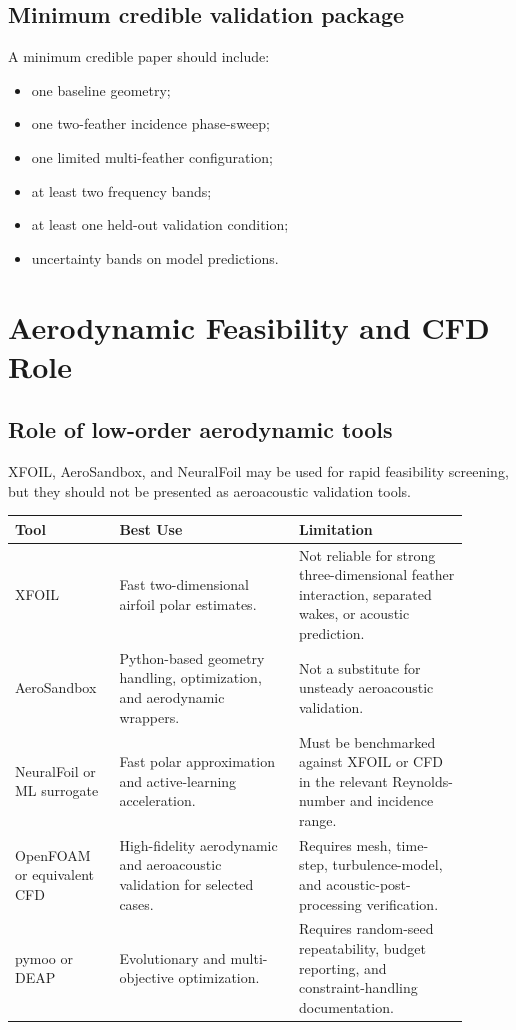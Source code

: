 \documentclass[11pt]{article}
\begin{document}
\subsection{Minimum credible validation package}

A minimum credible paper should include:

\begin{itemize}
    \item one baseline geometry;
    \item one two-feather incidence phase-sweep;
    \item one limited multi-feather configuration;
    \item at least two frequency bands;
    \item at least one held-out validation condition;
    \item uncertainty bands on model predictions.
\end{itemize}

\section{Aerodynamic Feasibility and CFD Role}

\subsection{Role of low-order aerodynamic tools}

XFOIL, AeroSandbox, and NeuralFoil may be used for rapid feasibility screening, but they should not be presented as aeroacoustic validation tools.

\begin{longtable}{p{0.2\linewidth} p{0.36\linewidth} p{0.34\linewidth}}
\toprule
\textbf{Tool} & \textbf{Best Use} & \textbf{Limitation} \\
\midrule
\endhead

XFOIL
&
Fast two-dimensional airfoil polar estimates.
&
Not reliable for strong three-dimensional feather interaction, separated wakes, or acoustic prediction.
\\

AeroSandbox
&
Python-based geometry handling, optimization, and aerodynamic wrappers.
&
Not a substitute for unsteady aeroacoustic validation.
\\

NeuralFoil or ML surrogate
&
Fast polar approximation and active-learning acceleration.
&
Must be benchmarked against XFOIL or CFD in the relevant Reynolds-number and incidence range.
\\

OpenFOAM or equivalent CFD
&
High-fidelity aerodynamic and aeroacoustic validation for selected cases.
&
Requires mesh, time-step, turbulence-model, and acoustic-post-processing verification.
\\

pymoo or DEAP
&
Evolutionary and multi-objective optimization.
&
Requires random-seed repeatability, budget reporting, and constraint-handling documentation.
\\

\bottomrule
\end{longtable}
\end{document}
